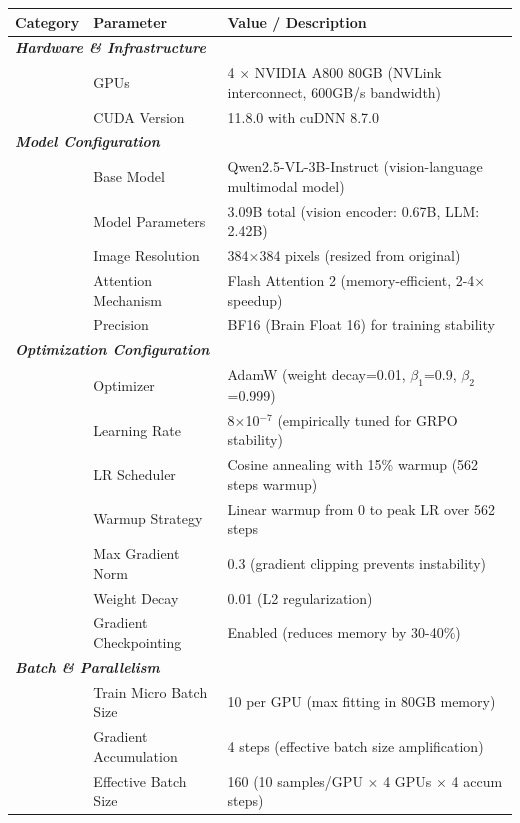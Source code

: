 \documentclass[11pt]{article}
\begin{document}
\begin{table}[t]
\centering
\footnotesize
\setlength{\tabcolsep}{3.5pt}
\renewcommand{\arraystretch}{1.1}
\begin{tabular}{llp{10cm}}
\hline
\textbf{Category} & \textbf{Parameter} & \textbf{Value / Description} \\
\hline
\multicolumn{3}{l}{\textit{\textbf{Hardware \& Infrastructure}}} \\
& GPUs & 4 $\times$ NVIDIA A800 80GB (NVLink interconnect, 600GB/s bandwidth) \\
& CUDA Version & 11.8.0 with cuDNN 8.7.0 \\
\hline
\multicolumn{3}{l}{\textit{\textbf{Model Configuration}}} \\
& Base Model & Qwen2.5-VL-3B-Instruct (vision-language multimodal model) \\
& Model Parameters & 3.09B total (vision encoder: 0.67B, LLM: 2.42B) \\
& Image Resolution & 384×384 pixels (resized from original) \\
& Attention Mechanism & Flash Attention 2 (memory-efficient, 2-4× speedup) \\
& Precision & BF16 (Brain Float 16) for training stability \\
\hline
\multicolumn{3}{l}{\textit{\textbf{Optimization Configuration}}} \\
& Optimizer & AdamW (weight decay=0.01, $\beta_1$=0.9, $\beta_2$=0.999) \\
& Learning Rate & 8$\times$10$^{-7}$ (empirically tuned for GRPO stability) \\
& LR Scheduler & Cosine annealing with 15\% warmup (562 steps warmup) \\
& Warmup Strategy & Linear warmup from 0 to peak LR over 562 steps \\
& Max Gradient Norm & 0.3 (gradient clipping prevents instability) \\
& Weight Decay & 0.01 (L2 regularization) \\
& Gradient Checkpointing & Enabled (reduces memory by 30-40\%) \\
\hline
\multicolumn{3}{l}{\textit{\textbf{Batch \& Parallelism}}} \\
& Train Micro Batch Size & 10 per GPU (max fitting in 80GB memory) \\
& Gradient Accumulation & 4 steps (effective batch size amplification) \\
& Effective Batch Size & 160 (10 samples/GPU $\times$ 4 GPUs $\times$ 4 accum steps) \\

\end{tabular}
\end{table}
\end{document}
